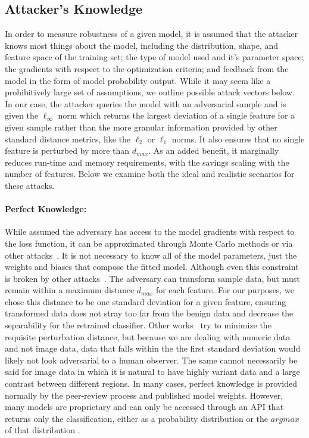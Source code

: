\documentclass[fonts]{icst}
\begin{document}
\subsection{Attacker's Knowledge}

In order to measure robustness of a given model, it is assumed that the attacker knows most things about the model, including the distribution, shape, and feature space of the training set; the type of model used and it's parameter space; the gradients with respect to the optimization criteria; and feedback from the model in the form of model probability output. While it may seem like a prohibitively large set of assumptions, we outline possible attack vectors below. In our case, the attacker queries the model with an adversarial sample and is given the $\ell_{\infty}$ norm which returns the largest deviation of a single feature for a given sample rather than the more granular information provided by other standard distance metrics, like the $\ell_2$ or $\ell_1$ norms. It also ensures that no single feature is perturbed by more than $d_{max}$. As an added benefit, it marginally reduces run-time and memory requirements, with the savings scaling with the number of features. Below we examine both the ideal and realistic scenarios for these attacks.

\paragraph{Perfect Knowledge: }
While assumed the adversary has access to the model gradients with respect to the loss function, it can be approximated through Monte Carlo methods or via other attacks~\cite{wang2019security,chakraborty2018adversarial}. It is not necessary to know all of the model parameters, just the weights and biases that compose the fitted model. Although even this constraint is broken by other attacks~\cite{wang2019security,chakraborty2018adversarial}. The adversary can transform sample data, but must remain within a maximum distance $d_{max}$ for each feature. For our purposes, we chose this distance to be one standard deviation for a given feature, ensuring transformed data does not stray too far from the benign data and decrease the separability for the retrained classifier. Other works~\cite{biggio2012poisoning,stutz2019confidence,li2016general} try to minimize the requisite perturbation distance, but because we are dealing with numeric data and not image data, data that falls within the the first standard deviation would likely not look adversarial to a human observer. The same cannot necessarily be said for image data in which it is natural to have highly variant data and a large contrast between different regions. In many cases, perfect knowledge is provided normally by the peer-review process and published model weights. However, many models are proprietary and can only be accessed through an API that returns only the classification, either as a probability distribution or the $argmax$ of that distribution \cite{tramer2016stealing}. 
\end{document}
